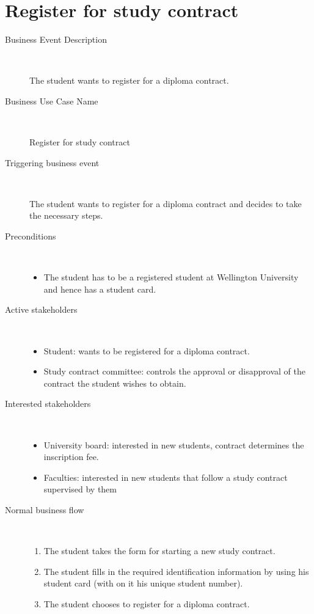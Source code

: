 \section{Register for study contract}

\begin{description}
	\item[Business Event Description] \ 
		\par The student wants to register for a diploma contract.
	\item[Business Use Case Name] \ 
		\par Register for study contract
	\item[Triggering business event] \ 
		\par The student wants to register for a diploma contract and decides to take the necessary steps.
	\item[Preconditions] \ 
	\begin{itemize}
		\item The student has to be a registered student at Wellington University and
		hence has a student card.
	\end{itemize}
	\item[Active stakeholders] \ 
	\begin{itemize}
		\item Student: wants to be registered for a diploma contract.
		\item Study contract committee: controls the approval or disapproval of the
		contract the student wishes to obtain.
	\end{itemize}
	\item[Interested stakeholders] \ 
		\begin{itemize}
		\item University board: interested in new students, contract determines the
		inscription fee.
		\item Faculties: interested in new students that follow a study contract supervised
		by them
		\end{itemize}
	\item[Normal business flow] \ 
	\begin{enumerate}
	  	\item The student takes the form for starting a new study contract.
	  	\item The student fills in the required identification information by using
	  	his student card (with on it his unique student number).
	  	\item The student chooses to register for a diploma contract.

\end{enumerate}
\end{description}
